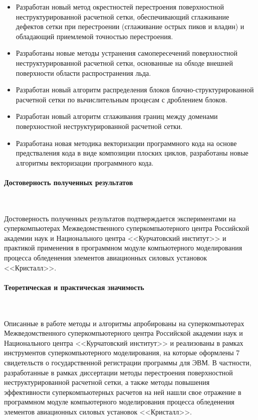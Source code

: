 \documentclass[a4paper,14pt]{extarticle}                     %
\theoremstyle{plain}                                         %
\begin{document}
\begin{itemize}[noitemsep,topsep=0pt,parsep=0pt,partopsep=0pt]
\item Разработан новый метод окрестностей перестроения поверхностной неструктурированной расчетной сетки, обеспечивающий сглаживание дефектов сетки при перестроении (сглаживание острых пиков и владин) и обладающий приемлемой точностью перестроения.
\item Разработаны новые методы устранения самопересечений поверхностной неструктурированной расчетной сетки, основанные на обходе внешней поверхности области распространения льда.
\item Разработан новый алгоритм распределения блоков блочно-структурированной расчетной сетки по вычислительным процесам с дроблением блоков.
\item Разработан новый алгоритм сглаживания границ между доменами поверхностной неструктурированной расчетной сетки.
\item Разработана новая методика векторизации программного кода на основе предстваления кода в виде композиции плоских циклов, разработаны новые алгоритмы векторизации программного кода.
\end{itemize}

\paragraph{Достоверность полученных результатов}

\

Достоверность полученных результатов подтверждается экспериментами на суперкомпьютерах Межведомственного суперкомпьютерного центра Российской академии наук и Национального центра <<Курчатовский институт>> и практикой применения в программном модуле компьютерного моделирования процесса обледенения элементов авиационных силовых установок <<Кристалл>>.

\paragraph{Теоретическая и практическая значимость}

\

Описанные в работе методы и алгоритмы апробированы на суперкомпьютерах Межведомственного суперкомпьютерного центра Российской академии наук и Национального центра <<Курчатовский институт>> и реализованы в рамках инструментов суперкомпьютерного моделирования, на которые оформлены 7 свидетельств о государственной регистрации программы для ЭВМ.
В частности, разработанные в рамках диссертации методы перестроения поверхностной неструктурированной расчетной сетки, а также методы повышения эффективности суперкомпьютерных расчетов на ней нашли свое отражение в программном модуле компьютерного моделирования процесса обледенения элементов авиационных силовых установок <<Кристалл>>.
\end{document}

